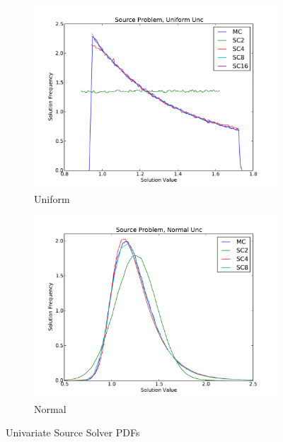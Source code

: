\begin{figure}[h]
\centering
  \begin{subfigure}[b]{0.45 \textwidth}
   \includegraphics[width=\textwidth]{../graphics/source_uniform_pdfs}
   \caption{Uniform}
      \label{uni}
  \end{subfigure}
  \begin{subfigure}[b]{0.45\textwidth}
   \includegraphics[width=\textwidth]{../graphics/source_normal_pdfs}
   \caption{Normal}
      \label{norm}
  \end{subfigure}
\caption{Univariate Source Solver PDFs}
\label{fig:source uni res}
\end{figure}

